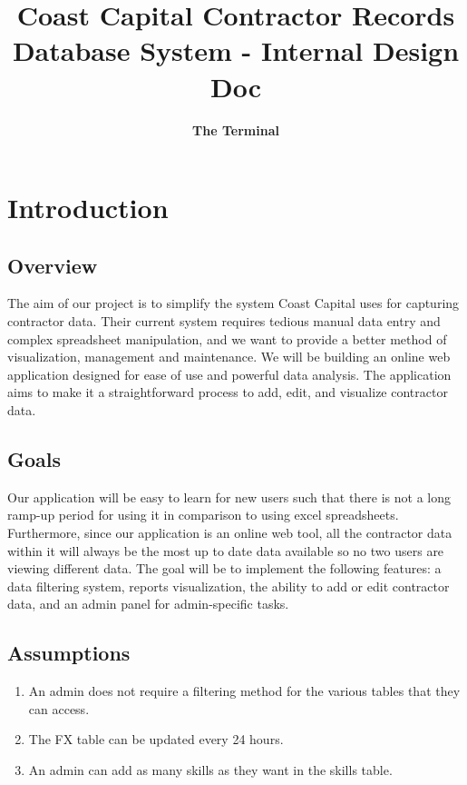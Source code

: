 \documentclass[11pt, titlepage]{article}
\author{\textbf{The Terminal}}
\title{\textbf{Coast Capital Contractor Records Database System - Internal Design Doc}}
\begin{document}
\maketitle

\tableofcontents

\clearpage

\section{Introduction}

\subsection{Overview}

The aim of our project is to simplify the system Coast Capital uses for capturing contractor data. Their current system requires tedious manual data entry and complex spreadsheet manipulation, and we want to provide a better method of visualization, management and maintenance. We will be building an online web application designed for ease of use and powerful data analysis. The application aims to make it a straightforward process to add, edit, and visualize contractor data.

\subsection{Goals}

Our application will be easy to learn for new users such that there is not a long ramp-up period for using it in comparison to using excel spreadsheets. Furthermore, since our application is an online web tool, all the contractor data within it will always be the most up to date data available so no two users are viewing different data. The goal will be to implement the following features: a data filtering system, reports visualization, the ability to add or edit contractor data, and an admin panel for admin-specific tasks.

\subsection{Assumptions}

\begin{enumerate}
    \item An admin does not require a filtering method for the various tables that they can access.
    \item The FX table can be updated every 24 hours.
    \item An admin can add as many skills as they want in the skills table.
\end{enumerate}
\end{document}
